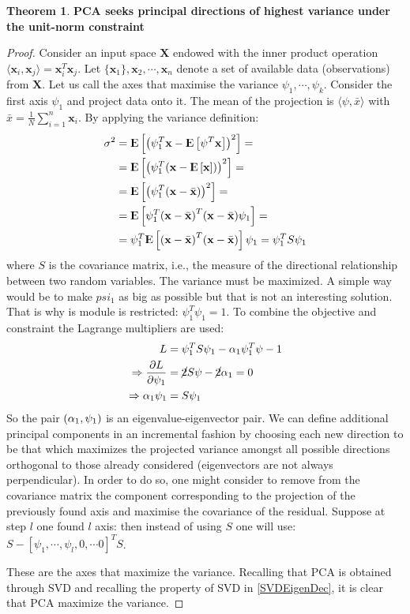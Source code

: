 \documentclass[12pt, letterpaper]{article}
\theoremstyle{definition}
\newcommand{\E}{{\rm I\kern-.3em E}}
\newcommand{\X}{\mathrm{\mathbf{X}}}
\newcommand{\x}{\mathbf{x}}
\DeclarePairedDelimiter\autobracket{(}{)}
\newcommand{\br}[1]{\autobracket*{#1}}
\newtheorem{theorem}{Theorem}
\let\tb\textbf
\begin{document}
\begin{theorem}{\tb{PCA seeks principal directions of highest variance under the unit-norm constraint}}
\label{PCAmaxVar}
\begin{proof}
Consider an input space $\X$ endowed with the inner product operation $\langle \x_i, \x_j\rangle = \x_i^T \x_j$. Let $\{\x_1\}, \x_2, \cdots, \x_n$ denote a set of available data (observations) from $\X$. Let us call the axes that maximise the variance $\psi_1, \cdots, \psi_k$. Consider the first axis $\psi_1$ and project data onto it. The mean of the projection is $\langle \psi, \bar{x}\rangle$ with $\bar{x} = \frac{1}{N} \sum_{i=1}^n \x_i$.
By applying the variance definition:
\begin{equation}
\begin{aligned}
\sigma^2 &= \E\left[ \br{\psi_1^T\x -\E\left[ \psi^T\x\right]}^2 \right] = \\
&= \E\left[ \br{\psi_1^T\br{\x - \E\left[\x\right]}}^2 \right] = \\
&= \E\left[ \br{\psi_1^T\br{\x - \bar{\x}}}^2 \right] = \\
&= \E\left[ \psi_1^T\br{\x - \bar{\x}}^T\br{\x - \bar{\x}}\psi_1 \right] = \\
&= \psi_1^T\E\left[ \br{\x - \bar{\x}}^T\br{\x - \bar{\x}} \right]\psi_1  =\psi_1^T S \psi_1 
\end{aligned}
\end{equation}
where $S$ is the covariance matrix, i.e., the measure of the directional relationship between two random variables.
The variance must be maximized. A simple way would be to make $psi_1$ as big as possible but that is not an interesting solution. That is why is module is restricted: $\psi_1^T \psi_1=1$. To combine the objective and constraint the Lagrange multipliers are used:
\begin{equation}
\begin{aligned}
L &= \psi_1^T S \psi_1  - \alpha_1 \psi_1^T \psi -1\\
\Rightarrow \frac{\partial L}{\partial \psi_1} &= \cancel{2}S \psi -\cancel{2} \alpha_1 = 0\\
\Rightarrow \alpha_1 \psi_1 &= S \psi_1
\end{aligned}
\end{equation}
So the pair $\br{\alpha_1, \psi_1}$ is an eigenvalue-eigenvector pair. We can define additional principal components in an incremental fashion by choosing each new direction to be that which maximizes the projected variance amongst all possible directions orthogonal to those already considered (eigenvectors are not always perpendicular). In order to do so, one might consider to remove from the covariance matrix the component corresponding to the projection of the previously found axis and maximise the covariance of the residual. Suppose at step $l$ one found $l$ axis: then instead of using $S$ one will use: $S-[\psi_1, \cdots, \psi_l, 0, \cdots 0]^T S$.

These are the axes that maximize the variance. Recalling that PCA is obtained through SVD and recalling the property of SVD in \ref{SVDEigenDec}, it is clear that PCA maximize the variance.
\end{proof}
\end{theorem}
\end{document}

